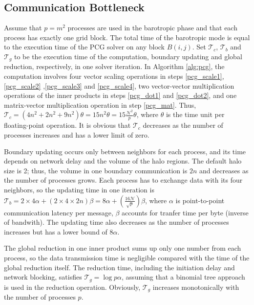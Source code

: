 \documentclass{sig-alternate}
\begin{document}
\subsection{Communication Bottleneck}
Assume that $p=m^2$ processes are used in the barotropic phase and that each process has exactly one grid block. The total time of the barotropic mode is equal to the execution time of the PCG solver on any block $B(i,j)$. Set $\mathcal{T}_c$, $\mathcal{T}_b$ and $\mathcal{T}_g$ to be the execution time of the computation, boundary updating and global reduction, respectively, in one solver iteration.
In Algorithm \ref{alg:pcg}, the computation involves four vector scaling operations in steps \ref{pcg_scale1},  \ref{pcg_scale2} ,\ref{pcg_scale3} and  \ref{pcg_scale4}, two vector-vector multiplication operations of the inner products in steps \ref{pcg_dot1} and \ref{pcg_dot2}, and one matrix-vector multiplication operation in step \ref{pcg_mat}. 
Thus, $\mathcal{T}_c= (4 n^2 +2n^2+ 9n^2)\theta  = 15n^2\theta  =15\frac{\mathcal{N}^2}{p}\theta $, where $\theta$ is the time unit per floating-point operation. 
It is obvious that $\mathcal{T}_c$ decreases as the number of processes increases and has a lower limit of zero.

Boundary updating occurs only between neighbors for each process, and its time depends on network delay and the volume of the halo regions. 
The default halo size is 2; thus, the volume in one boundary communication is $2n$ and decreases as the number of processes grows. 
Each process has to exchange data with its four neighbors, so the updating time in one iteration is $\mathcal{T}_b =2\times4\alpha +(2\times4\times 2n)\beta=8\alpha +(\frac{16\mathcal{N}}{\sqrt{p}})\beta $, where $\alpha$ is point-to-point communication latency per message, $\beta$ accounts for tranfer time per byte (inverse of bandwith).
The updating time also decreases as the number of processes increases but has a lower bound of $8\alpha$.

The global reduction in one inner product sums up only one number from each process, so the data transmission time is negligible compared with the time of the global reduction itself. 
The reduction time, including the initiation delay and network blocking, satisfies $\mathcal{T}_g= \log p \alpha$, assuming that a binomial tree approach is used in the reduction operation. Obviously, $\mathcal{T}_g$ increases monotonically with the number of processes $p$.
\end{document}

